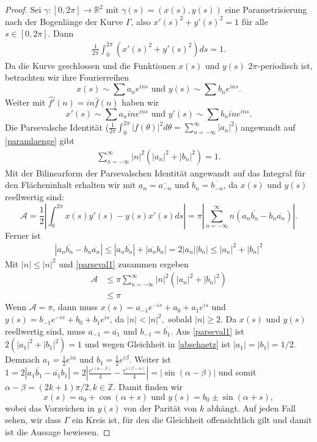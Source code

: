 \documentclass[12pt,a4paper]{article}
\theoremstyle{plain}
\newcommand{\R}{\mathbb{R}}
\newcommand{\Z}{\mathbb{Z}}
\numberwithin{equation}{section}
\begin{document}
\begin{proof}
Sei $\gamma:[0,2\pi]\rightarrow \R^2$ mit $\gamma(s)=(x(s),y(s))$ eine Parametrisierung nach der Bogenlänge der Kurve $\Gamma$, also $x'(s)^2+y'(s)^2=1$ für alle $s\in [0,2\pi]$. Dann \begin{align}\label{paramlaenge}
\frac{1}{2\pi} \int_0^{2\pi} {\left(x'(s)^2+y'(s)^2\right) ds} = 1.
\end{align} 
Da die Kurve geschlossen und die Funktionen $x(s)$ und $y(s)$ $2\pi$-periodisch ist, betrachten wir ihre Fourierreihen \[x(s)\sim \sum a_ne^{ins} \text{ und } y(s)\sim \sum b_ne^{ins}. \]  Weiter mit $\hat{f'}(n)=i n\hat{f}(n)$ haben wir \[x'(s)\sim \sum  a_n i n e^{ins} \text{ und } y'(s)\sim \sum b_n i n e^{ins}. \] Die Parsevalsche Identität ($\frac{1}{2\pi}\int_0^{2\pi}|f(\theta)|^2d\theta = \sum_{n=-\infty}^\infty |a_n|^2$) angewandt auf \eqref{paramlaenge} gibt \begin{align} \label{parseval1}
\sum_{n=-\infty}^\infty |n|^2(|a_n|^2+|b_n|^2)=1.
\end{align}
Mit der Bilinearform der Parsevalschen Identität angewandt auf das Integral für den Flächen\-in\-halt erhalten wir mit $a_n=\overline{a_{-n}}$ und $b_n=\overline{b_{-n}}$, da $x(s)$ und $y(s)$ reellwertig sind:
\[\mathcal{A}=\frac{1}{2} \left|\int_0^{2\pi} {x(s)y'(s)-y(s)x'(s)ds}\right|=\pi\left|\sum_{n=-\infty}^\infty {n\left(a_n\overline{b_n}-b_n\overline{a_n}\right) } \right|. \] 
Ferner ist \begin{align} \label{abschaetz}
|a_n\overline{b_n} -b_n\overline{a_n}|\leq |a_n\overline{b_n}|+|\overline{a_n}b_n|=2|a_n||b_n|\leq |a_n|^2+|b_n|^2
\end{align}
Mit $|n|\leq |n|^2$ und \eqref{parseval1} zusammen ergeben \begin{align*}
\mathcal{A}&\leq \pi \sum_{n=-\infty}^{\infty}{|n|^2(|a_n|^2+|b_n|^2)} \\
&\leq \pi
\end{align*}
Wenn $\mathcal{A}=\pi$, dann muss $x(s)=a_{-1}e^{-is}+a_0+a_1e^{is}$ und $y(s)=b_{-1}e^{-is}+b_0+b_1e^{is}$, da $|n|<|n|^2,$ sobald $|n|\geq 2$. Da $x(s)$ und $y(s)$ reellwertig sind, muss $a_{-1}=\overline{a_1}$ und $b_{-1}=\overline{b_1}$. Aus \eqref{parseval1} ist $2(|a_1|^2+|b_1|^2)=1$ und wegen Gleichheit in \eqref{abschaetz} ist $|a_1|=|b_1|=1/2.$ Demnach $a_1=\frac{1}{2}e^{i\alpha}$ und $b_1=\frac{1}{2}e^{i\beta}$. Weiter ist $1=2|a_1\overline{b_1}-\overline{a_1}b_1|=2\left|\frac{e^{i(\alpha-\beta)}}{4}-\frac{e^{i(\beta-\alpha)}}{4}\right|=|\sin(\alpha - \beta)|$ und somit $\alpha-\beta=(2k+1)\pi/2, k\in \Z$. Damit finden wir
\[ x(s)=a_0+\cos(\alpha+s) \text{ und } y(s)=b_0 \pm\sin(\alpha +s),\] wobei das Vorzeichen in $y(s)$ von der Parität von $k$ abhängt. Auf jeden Fall sehen, wir dass $\Gamma$ ein Kreis ist, für den die Gleichheit offensichtlich gilt und damit ist die Aussage bewiesen.
\end{proof}
\end{document}
